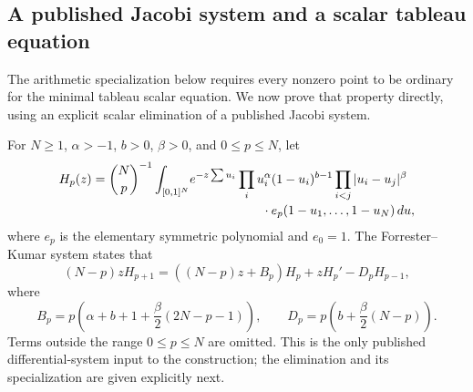 \documentclass[11pt,a4paper]{article}
\theoremstyle{definition}
\theoremstyle{remark}
\numberwithin{equation}{section}
\begin{document}
\subsection{A published Jacobi system and a scalar tableau equation}

The arithmetic specialization below requires every nonzero
point to be ordinary for the minimal tableau scalar equation.
We now prove that property directly, using an explicit scalar
elimination of a published Jacobi system.

For $N\ge1$, $\alpha>-1$, $b>0$, $\beta>0$, and $0\le p\le N$, let
\[
 \begin{aligned}
 H_p(z)=\binom Np^{-1}\int_{[0,1]^N}
 &e^{-z\sum u_i}\prod_i u_i^\alpha(1-u_i)^{b-1}
 \prod_{i<j}|u_i-u_j|^\beta\\[-2pt]
 &\hspace{20mm}\cdot e_p(1-u_1,\ldots,1-u_N)\,du,
 \end{aligned}
\]
where $e_p$ is the elementary symmetric polynomial and $e_0=1$.
The Forrester--Kumar system
\cite[Corollary 2.5, equations (2.19)--(2.20)]{p8:SFB_FK}
states that
\begin{equation}\label{p8:sfb:FKsystem}
 (N-p)zH_{p+1}=((N-p)z+B_p)H_p+zH_p'-D_pH_{p-1},
\end{equation}
where
\[
 B_p=p\left(\alpha+b+1+\frac\beta2(2N-p-1)\right),\qquad
 D_p=p\left(b+\frac\beta2(N-p)\right).
\]
Terms outside the range $0\le p\le N$ are omitted.
This is the only published differential-system input to the
construction; the elimination and its specialization are given
explicitly next.
\end{document}
